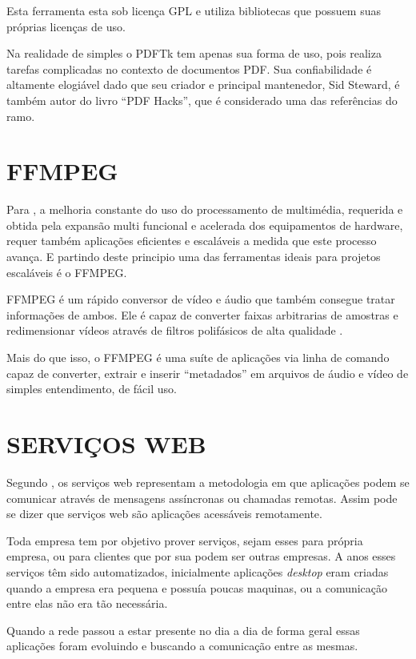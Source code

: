 Esta ferramenta esta sob licença GPL e utiliza bibliotecas que possuem suas próprias licenças de uso.

Na realidade de simples o PDFTk tem apenas sua forma de uso, pois realiza tarefas complicadas no contexto de documentos PDF. Sua confiabilidade é altamente elogiável dado que seu criador e principal mantenedor, Sid Steward, é também autor do livro “PDF Hacks”, que é considerado uma das referências do ramo.


\section{FFMPEG}

Para \cite{FFMPEG-SCALABLE}, a melhoria constante do uso do processamento de multimédia, requerida e obtida pela expansão multi funcional e acelerada dos equipamentos de hardware, requer também aplicações eficientes e escaláveis a medida que este processo avança. E partindo deste principio uma das ferramentas ideais para projetos escaláveis é o FFMPEG.

FFMPEG é um rápido conversor de vídeo e áudio que também consegue tratar informações de ambos. Ele é capaz de converter faixas arbitrarias de amostras e redimensionar vídeos através de filtros polifásicos de alta qualidade \cite{FFMPEG}.

Mais do que isso, o FFMPEG é uma suíte de aplicações via linha de comando capaz de converter, extrair e inserir ``metadados'' em arquivos de áudio e vídeo de simples entendimento, de fácil uso.


\section{SERVIÇOS WEB}

Segundo \cite{PIRNAU}, os serviços web representam a metodologia em que aplicações podem se comunicar através de mensagens assíncronas ou chamadas remotas. Assim pode se dizer que serviços web são aplicações acessáveis remotamente.

Toda empresa tem por objetivo prover serviços, sejam esses para própria empresa, ou para clientes que por sua podem ser outras empresas. A anos esses serviços têm sido automatizados, inicialmente aplicações \textit{desktop} eram criadas quando a empresa era pequena e possuía poucas maquinas, ou a comunicação entre elas não era tão necessária.

Quando a rede passou a estar presente no dia a dia de forma geral essas aplicações foram evoluindo e buscando a comunicação entre as mesmas.

